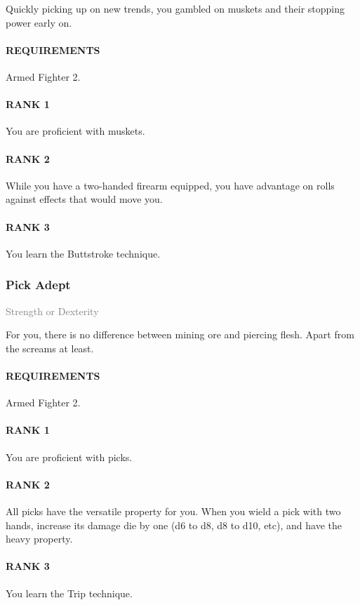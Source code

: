 \normalsize
Quickly picking up on new trends, you gambled on muskets and their stopping power early on.
\paragraph{REQUIREMENTS} Armed Fighter 2.
\paragraph{RANK 1} You are proficient with muskets.
\paragraph{RANK 2} While you have a two-handed firearm equipped, you have advantage on rolls against effects that would move you.
\paragraph{RANK 3} You learn the Buttstroke technique.

\subsubsection{Pick Adept} \label{feat::pickadept}
\small{\textcolor{gray}{Strength or Dexterity}}

\normalsize
For you, there is no difference between mining ore and piercing flesh.
Apart from the screams at least.
\paragraph{REQUIREMENTS} Armed Fighter 2.
\paragraph{RANK 1} You are proficient with picks.
\paragraph{RANK 2} All picks have the versatile property for you.
When you wield a pick with two hands, increase its damage die by one (d6 to d8, d8 to d10, etc), and have the heavy property.
\paragraph{RANK 3} You learn the Trip technique.


